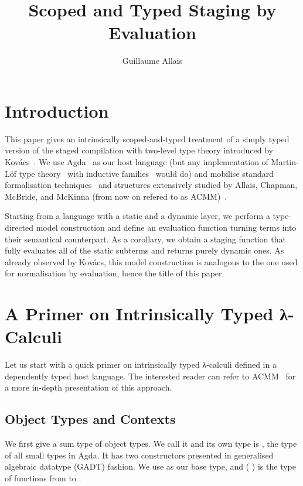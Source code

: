 \documentclass{article}
\title{Scoped and Typed Staging by Evaluation}
\author{Guillaume Allais}
\begin{document}
\maketitle

\section{Introduction}

This paper gives an intrinsically scoped-and-typed
treatment of a simply typed version of the staged compilation
with two-level type theory introduced by
Kov{\'{a}}cs~\cite{DBLP:journals/pacmpl/Kovacs22}.
%
We use Agda~\cite{DBLP:conf/afp/Norell08}
as our host language (but any implementation
of Martin-Löf type theory~\cite{DBLP:books/daglib/0000395}
with inductive families~\cite{DBLP:journals/fac/Dybjer94}
would do)
and mobilise standard formalisation
techniques~\cite{DBLP:journals/lisp/Coquand02, DBLP:journals/jar/BentonHKM12}
and structures extensively studied by Allais, Chapman,
McBride, and McKinna (from now on refered to as ACMM)~\cite{DBLP:conf/cpp/Allais0MM17}.

Starting from a language with a static and a dynamic layer,
we perform a type-directed model construction
and define an evaluation function turning terms
into their semantical counterpart.
%
As a corollary, we obtain a staging function that
fully evaluates all of the static subterms and returns
purely dynamic ones.
%
As already observed by Kov{\'{a}}cs, this model construction
is analogous to the one used for normalisation by evaluation,
hence the title of this paper.


\section{A Primer on Intrinsically Typed λ-Calculi}\label{sec:intrinsictyping}

Let us start with a quick primer on intrinsically typed λ-calculi
defined in a dependently typed host language. The interested reader
can refer to ACMM~\cite{DBLP:conf/cpp/Allais0MM17} for a more in-depth
presentation of this approach.

\subsection{Object Types and Contexts}

We first give a sum type of object types. We call it  and
its own type is , the type of all small types in Agda.
It has two constructors presented in generalised algebraic datatype
(GADT) fashion.
We use  as our base type,
and (  ) is the type of functions from
 to .
\end{document}
